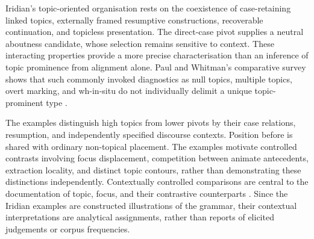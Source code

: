 Iridian's topic-oriented organisation rests on the coexistence of case-retaining
 linked topics, externally framed resumptive constructions, recoverable
 continuation, and topicless presentation. The direct-case pivot supplies a
 neutral aboutness candidate, whose selection remains sensitive to context.
 These interacting properties provide a more precise characterisation than
 an inference of topic prominence from alignment alone. Paul and Whitman's
 comparative survey shows that such commonly invoked diagnostics as null
 topics, multiple topics, overt marking, and wh-in-situ do not individually
 delimit a unique topic-prominent type \cite{paulwhitman2017}.

The examples distinguish high topics from lower pivots by their case
 relations, resumption, and independently specified discourse contexts.
 Position before  is shared with ordinary non-topical placement. The examples motivate controlled contrasts involving focus displacement,
 competition between animate antecedents, extraction locality, and distinct
 topic contours, rather than demonstrating these distinctions independently. Contextually controlled comparisons are central to the
 documentation of topic, focus, and their contrastive counterparts
 \cite{aissen2026}. Since the Iridian examples are constructed illustrations
 of the grammar, their contextual interpretations are analytical assignments,
 rather than reports of elicited judgements or corpus frequencies.

